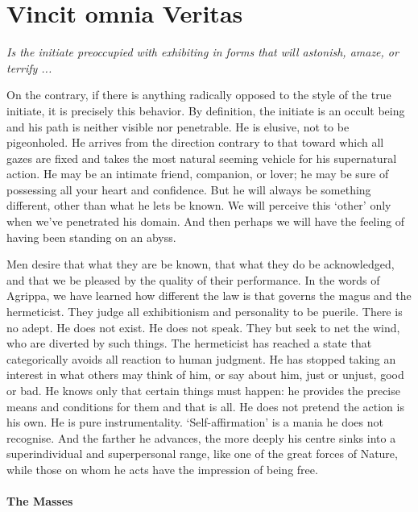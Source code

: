 \section{Vincit omnia Veritas}
\label{sec:VincitOmniaVeritas}
\begin{quotationx}
\emph{Is the initiate preoccupied with exhibiting in forms that will astonish, amaze, or terrify ... }

On the contrary, if there is anything radically opposed to the style of the true initiate, it is precisely this behavior. By definition, the initiate is an occult being and his path is neither visible nor penetrable. He is elusive, not to be pigeonholed. He arrives from the direction contrary to that toward which all gazes are fixed and takes the most natural seeming vehicle for his supernatural action. He may be an intimate friend, companion, or lover; he may be sure of possessing all your heart and confidence. But he will always be something different, other than what he lets be known. We will perceive this `other' only when we've penetrated his domain. And then perhaps we will have the feeling of having been standing on an abyss.

Men desire that what they are be known, that what they do be acknowledged, and that we be pleased by the quality of their performance. In the words of Agrippa, we have learned how different the law is that governs the magus and the hermeticist. They judge all exhibitionism and personality to be puerile. There is no adept. He does not exist. He does not speak. They but seek to net the wind, who are diverted by such things. The hermeticist has reached a state that categorically avoids all reaction to human judgment. He has stopped taking an interest in what others may think of him, or say about him, just or unjust, good or bad. He knows only that certain things must happen: he provides the precise means and conditions for them and that is all. He does not pretend the action is his own. He is pure instrumentality. `Self-affirmation' is a mania he does not recognise. And the farther he advances, the more deeply his centre sinks into a superindividual and superpersonal range, like one of the great forces of Nature, while those on whom he acts have the impression of being free.
\end{quotationx}


\paragraph{The Masses}


